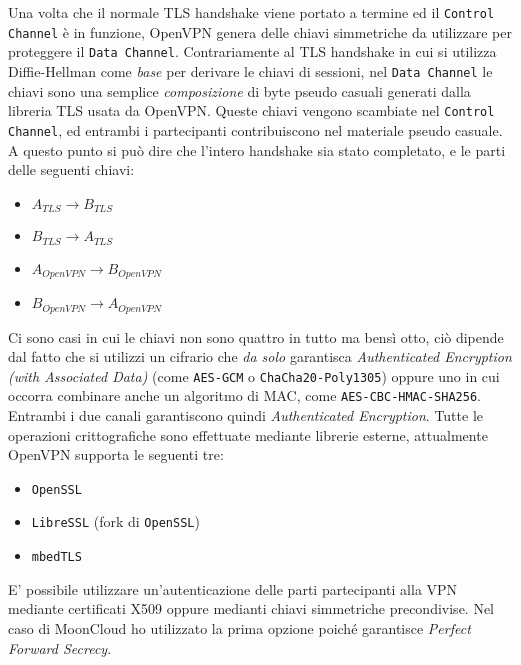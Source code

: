 Una volta che il normale TLS handshake viene portato a termine ed il \texttt{Control Channel}
è in funzione, OpenVPN genera delle chiavi simmetriche da utilizzare per proteggere
il \texttt{Data Channel}. Contrariamente al TLS handshake in cui si utilizza Diffie-Hellman
come \textit{base} per derivare le chiavi di sessioni, nel \texttt{Data Channel} le
chiavi sono una semplice \textit{composizione} di byte pseudo casuali generati
dalla libreria TLS usata da OpenVPN. Queste chiavi
vengono scambiate nel \texttt{Control Channel}, ed entrambi i partecipanti contribuiscono
nel materiale pseudo casuale.\\
A questo punto si può dire che l'intero handshake sia stato completato, e le parti
delle seguenti chiavi:
\begin{itemize}
	\item $A_{TLS} \rightarrow B_{TLS}$
	\item $B_{TLS} \rightarrow A_{TLS}$
	\item $A_{OpenVPN} \rightarrow B_{OpenVPN}$
	\item $B_{OpenVPN} \rightarrow A_{OpenVPN}$
\end{itemize}
Ci sono casi in cui le chiavi non sono quattro in tutto ma bensì otto, ciò dipende
dal fatto che si utilizzi un cifrario che \textit{da solo} garantisca \textit{Authenticated
	Encryption (with Associated Data)} (come \texttt{AES-GCM} o \texttt{ChaCha20-Poly1305}) oppure uno in cui
occorra combinare anche un algoritmo di MAC, come \texttt{AES-CBC-HMAC-SHA256}.
Entrambi i due canali garantiscono quindi \textit{Authenticated Encryption}.
Tutte le operazioni crittografiche sono effettuate mediante librerie esterne,
attualmente OpenVPN supporta le seguenti tre:
\begin{itemize}
	\item \texttt{OpenSSL}
	\item \texttt{LibreSSL} (fork di \texttt{OpenSSL})
	\item \texttt{mbedTLS}
\end{itemize}

E' possibile utilizzare un'autenticazione delle parti partecipanti alla VPN mediante
certificati X509 oppure medianti chiavi simmetriche precondivise. Nel caso di MoonCloud
ho utilizzato la prima opzione poiché garantisce \textit{Perfect Forward Secrecy}.


